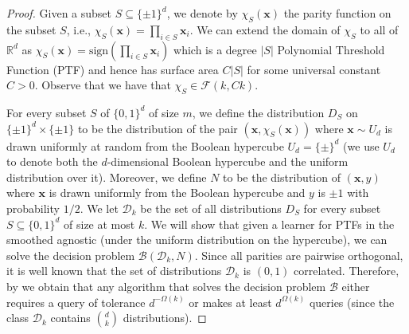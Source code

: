 \documentclass{theoretics}
\renewcommand\vec[1]{\mathbf{#1}}
\newcommand{\R}{\mathbb{R}}
\newcommand{\sign}{\mathrm{sign}}
\newcommand{\1}{\Ind}
\newcommand{\x}{\vec x}
\newcommand{\F}{\mathcal{F}}
\begin{document}
\begin{proof}


Given a subset $S \subseteq \{\pm 1\}^d$,  we denote by $\chi_S(\x)$ the parity function on the subset $S$, i.e.,
$\chi_S(\x) = \prod_{i\in S}\x_{i}$. We can extend the domain of $\chi_S$ to all of $\R^{d}$ as  $\chi_S(\x)=\sign(\prod_{i\in S}\x_{i})$ which is a degree $|S|$ Polynomial Threshold Function (PTF) and hence has surface area $C|S|$ for some universal constant $C>0$. Observe that we have that $\chi_S\in \F(k,Ck)$.

For every subset $S$ of $\{0, 1\}^d$ of size $m$, we define the distribution $D_S$ 
on $\{\pm 1\}^d \times \{\pm 1\}$ to be the distribution
of the pair $(\x, \chi_S(\x))$ where $\x \sim U_d$ is drawn uniformly at random from the Boolean hypercube $U_d = \{\pm\}^d$ (we use $U_d$ to denote both the $d$-dimensional Boolean hypercube and the uniform distribution over it).
Moreover, we define $N$ to be the distribution of $(\x, y)$
where $\x$ is drawn uniformly from the Boolean hypercube
and $y$ is $\pm 1$ with probability $1/2$. 
We let $\mathcal{D}_k$ be the set of all distributions $D_S$
for every subset $S \subseteq \{0, 1\}^d$ of size at most $k$. 
We will show that given a learner for PTFs in the smoothed agnostic
 (under the uniform distribution on the hypercube), we can solve the decision problem $\mathcal{B}(\mathcal D_k, N)$.  
Since all parities are pairwise orthogonal, it is well known that the set of distributions $\mathcal D_k$ is $(0,1)$ correlated.  Therefore, by  we obtain that any algorithm that solves 
the decision problem $\mathcal{B}$ either requires 
a query of tolerance $d^{-\Omega(k)}$ or makes at least
$d^{\Omega(k)}$ queries (since the class $\mathcal D_k$
contains $\binom{d}{k}$ distributions).


\end{proof}
\end{document}
